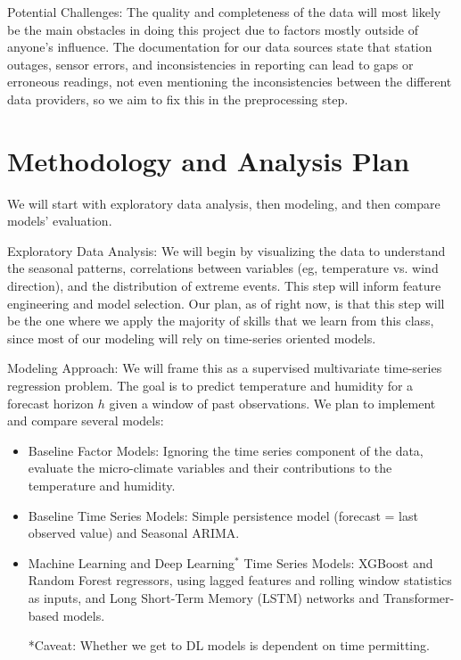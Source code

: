 \documentclass{article}
\begin{document}
Potential Challenges: The quality and completeness of the data will most likely be the main obstacles in doing this project due to factors mostly outside of anyone's influence. The documentation for our data sources state that station outages, sensor errors, and inconsistencies in reporting can lead to gaps or erroneous readings, not even mentioning the inconsistencies between the different data providers, so we aim to fix this in the preprocessing step. 

\section{Methodology and Analysis Plan}

We will start with exploratory data analysis, then modeling, and then compare models' evaluation.

Exploratory Data Analysis: We will begin by visualizing the data to understand the seasonal patterns, correlations between variables (eg, temperature vs. wind direction), and the distribution of extreme events. This step will inform feature engineering and model selection. Our plan, as of right now, is that this step will be the one where we apply the majority of skills that we learn from this class, since most of our modeling will rely on time-series oriented models.

Modeling Approach: We will frame this as a supervised multivariate time-series regression problem. The goal is to predict temperature and humidity for a forecast horizon $h$ given a window of past observations. We plan to implement and compare several models:
    \begin{itemize}
        \item Baseline Factor Models: Ignoring the time series component of the data, evaluate the micro-climate variables and their contributions to the temperature and humidity.
        \item Baseline Time Series Models: Simple persistence model (forecast = last observed value) and Seasonal ARIMA.
        \item Machine Learning and Deep Learning$^*$ Time Series Models: XGBoost and Random Forest regressors, using lagged features and rolling window statistics as inputs, and Long Short-Term Memory (LSTM) networks and Transformer-based models. 
        
        *Caveat: Whether we get to DL models is dependent on time permitting.
    \end{itemize}
\end{document}
